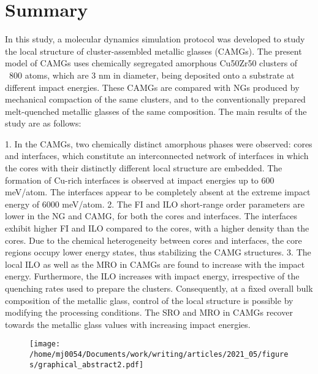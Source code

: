 \section{Summary}

\begin{selfcite}
In this study, a molecular dynamics simulation protocol was developed to study the local structure of \cz cluster-assembled metallic glasses (CAMGs). The present model of CAMGs uses chemically segregated amorphous Cu50Zr50 clusters of ~800 atoms, which are 3 nm in diameter, being deposited onto a substrate at different impact energies. These CAMGs are compared with NGs produced by mechanical compaction of the same clusters, and to the conventionally prepared melt-quenched metallic glasses of the same composition. The main results of the study are as follows:

1. In the CAMGs, two chemically distinct amorphous phases were observed: cores and interfaces, which constitute an interconnected network of interfaces in which the cores with their distinctly different local structure are embedded. The formation of Cu-rich interfaces is observed at impact energies up to 600 meV/atom. The interfaces appear to be completely absent at the extreme impact energy of 6000 meV/atom.
2. The FI and ILO short-range order parameters are lower in the NG and CAMG, for both the cores and interfaces. The interfaces exhibit higher FI and ILO compared to the cores, with a higher density than the cores. Due to the chemical heterogeneity between cores and interfaces, the core regions occupy lower energy states, thus stabilizing the CAMG structures.
3. The local ILO as well as the MRO in CAMGs are found to increase with the impact energy. Furthermore, the ILO increases with impact energy, irrespective of the quenching rates used to prepare the clusters. Consequently, at a fixed overall bulk composition of the metallic glass, control of the local structure is possible by modifying the processing conditions. The SRO and MRO in CAMGs recover towards the metallic glass values with increasing impact energies.
\end{selfcite}



\begin{figure}
	\texttt{[image: /home/mj0054/Documents/work/writing/articles/2021\_05/figures/graphical\_abstract2.pdf]}
	\label{f:camg-summary}
\end{figure}